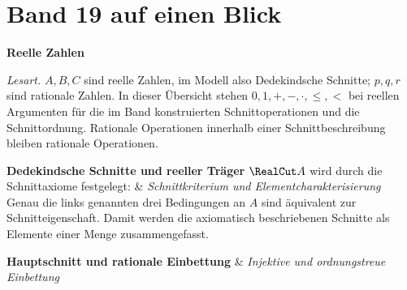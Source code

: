 \chapter[Band 19: Reelle Zahlen]{Band 19 auf einen Blick}
\noindent\textbf{Reelle Zahlen}\par\medskip
\noindent\emph{Lesart.}
\(A,B,C\) sind reelle Zahlen, im Modell also Dedekindsche Schnitte;
\(p,q,r\) sind rationale Zahlen. In dieser Übersicht stehen
\(0,1,+,-,\cdot,\leq,<\) bei reellen Argumenten für die im Band konstruierten
Schnittoperationen und die Schnittordnung. Rationale Operationen innerhalb
einer Schnittbeschreibung bleiben rationale Operationen.

\begin{BandUebersicht}
\textbf{Dedekindsche Schnitte und reeller Träger}
\(\RealCut A\) wird durch die Schnittaxiome festgelegt:
&
\textit{Schnittkriterium und Elementcharakterisierung}
Genau die links genannten drei Bedingungen an \(A\) sind
äquivalent zur Schnitteigenschaft.
Damit werden die axiomatisch beschriebenen Schnitte als Elemente
einer Menge zusammengefasst.
\\ \addlinespace[.8ex]

\textbf{Hauptschnitt und rationale Einbettung}
&
\textit{Injektive und ordnungstreue Einbettung}
\\ \addlinespace[.8ex]


\end{BandUebersicht}
